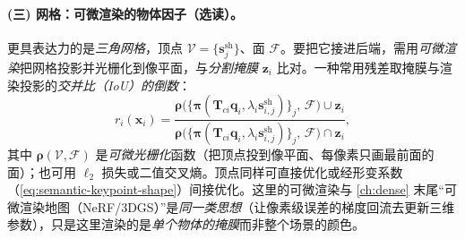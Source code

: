 \paragraph{(三) 网格：可微渲染的物体因子（选读）。}
更具表达力的是\emph{三角网格}，顶点 $\mathcal{V}=\{\mathbf{s}^{\mathrm{sh}}_j\}$、面 $\mathcal{F}$。要把它接进后端，需用\emph{可微渲染}\cite{kato2018neural,liu2019softras}把网格投影并光栅化到像平面，与\emph{分割掩膜} $\mathbf{z}_i$ 比对。一种常用残差取掩膜与渲染投影的\emph{交并比（IoU）的倒数}：
\begin{equation}
  r_i(\mathbf{x}_i)=\frac{\boldsymbol\rho\big(\{\boldsymbol\pi(\mathbf{T}_{ci}\mathbf{q}_i,\lambda_i\mathbf{s}^{\mathrm{sh}}_{i,j})\}_j,\,\mathcal{F}\big)\cup\mathbf{z}_i}{\boldsymbol\rho\big(\{\boldsymbol\pi(\mathbf{T}_{ci}\mathbf{q}_i,\lambda_i\mathbf{s}^{\mathrm{sh}}_{i,j})\}_j,\,\mathcal{F}\big)\cap\mathbf{z}_i},
  \label{eq:semantic-mesh-residual}
\end{equation}
其中 $\boldsymbol\rho(\mathcal{V},\mathcal{F})$ 是\emph{可微光栅化}函数（把顶点投到像平面、每像素只画最前面的面）\cite{loper2014opendr}；也可用 $\ell_2$ 损失或二值交叉熵\cite{wang2020directshape}。顶点同样可直接优化或经形变系数（\cref{eq:semantic-keypoint-shape}）间接优化。这里的可微渲染与 \cref{ch:dense} 末尾“可微渲染地图（NeRF/3DGS）”是\emph{同一类思想}（让像素级误差的梯度回流去更新三维参数），只是这里渲染的是\emph{单个物体的掩膜}而非整个场景的颜色。


